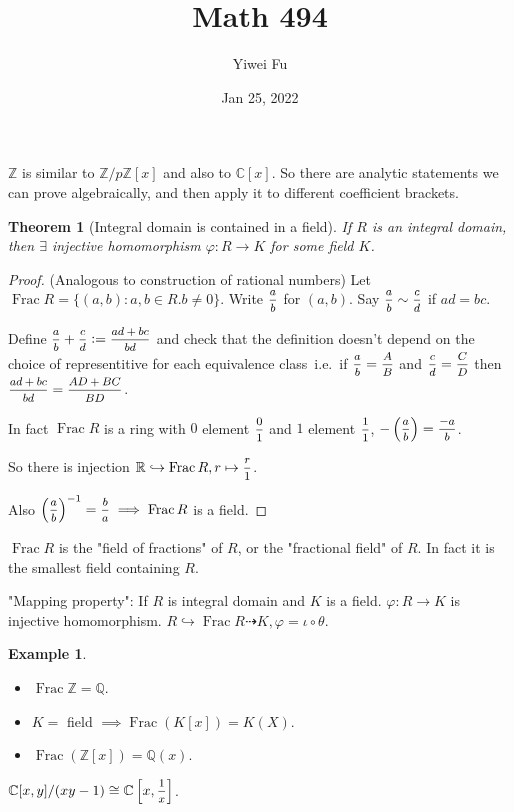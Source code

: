 \documentclass{article}
\newcommand{\R}{\mathbb{R}}
\newcommand{\C}{\mathbb{C}}
\newcommand{\Z}{\mathbb{Z}}
\newcommand{\Q}{\mathbb{Q}}
\newcommand{\ie}{\ i.e.\ }
\newcommand{\defeq}{\vcentcolon=}
\newtheorem*{theorem}{Theorem}
\theoremstyle{definition}
\newtheorem*{example}{Example}
\theoremstyle{remark}
\begin{document}
\renewcommand{\ref}[1]{\autoref{#1}}
\title{Math 494}
\author{Yiwei Fu}
\date{Jan 25, 2022}
\maketitle

$\Z$ is similar to $\Z/p\Z[x]$ and also to $\C[x]$. So there are analytic statements we can prove algebraically, and then apply it to different coefficient brackets.

\begin{theorem}[Integral domain is contained in a field]
If $R$ is an integral domain, then $\exists$ injective homomorphism $\varphi: R \to K$ for some field $K$.
\end{theorem}
\begin{proof}(Analogous to construction of rational numbers)
Let $\operatorname{Frac}{R} = \{(a, b): a, b \in R. b \neq 0\}$. Write $\mfrac{a}{b}$ for $(a, b)$. Say $\mfrac{a}{b} \sim \mfrac{c}{d}$ if $ad = bc$.

Define $\mfrac{a}{b} + \mfrac{c}{d} \defeq \mfrac{ad + bc}{bd}$ and check that the definition doesn't depend on the choice of representitive for each equivalence class\ie if $\mfrac{a}{b} = \mfrac{A}{B}$ and $\mfrac{c}{d} = \mfrac{C}{D}$ then $\mfrac{ad + bc}{bd} = \mfrac{AD + BC}{BD}$.

In fact $\operatorname{Frac}{R}$ is a ring with $0$ element $\mfrac{0}{1}$ and $1$ element $\mfrac{1}{1}$, $-\left(\mfrac{a}{b}\right) = \mfrac{-a}{b}$.

So there is injection $\R \hookrightarrow \operatorname{Frac}{R}, r \mapsto \mfrac{r}{1}$.

Also $\left(\mfrac{a}{b}\right)^{-1} = \mfrac{b}{a} \implies \operatorname{Frac}{R}$ is a field.
\end{proof}

$\operatorname{Frac}{R}$ is the "field of fractions" of $R$, or the "fractional field" of $R$. In fact it is the smallest field containing $R$.

"Mapping property":
If $R$ is integral domain and $K$ is a field. $\varphi: R \to K$ is injective homomorphism. $R \hookrightarrow \operatorname{Frac}{R} \dashrightarrow K, \varphi = \iota \circ \theta$.

\begin{example}
\begin{itemize}
\item $\operatorname{Frac}{\Z} = \Q$.
\item $K = $ field $\implies \operatorname{Frac}(K[x]) = K(X)$.
\item $\operatorname{Frac}(\Z[x]) = \Q(x)$.
\end{itemize}

$\C[x, y]/(xy - 1) \cong \C\left[x, \mfrac{1}{x}\right]$.

\end{example}
\end{document}
